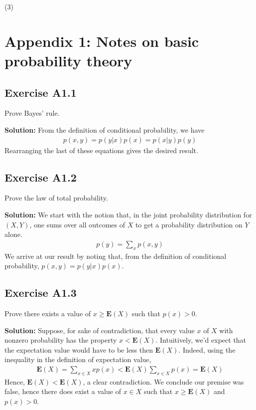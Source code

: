 \documentclass{book}
\begin{document}
    (3) 

\chapter*{Appendix 1: Notes on basic probability theory}


\section*{Exercise A1.1} 
    Prove Bayes' rule.
    
    \textbf{Solution:} From the definition of conditional probability, we have
    \begin{align}
        p(x,y) = p(y|x)p(x) = p(x|y)p(y)
    \end{align}
    Rearranging the last of these equations gives the desired result.

\section*{Exercise A1.2}
    Prove the law of total probability.
    
    \textbf{Solution:} We start with the notion that, in the joint probability distribution for $(X,Y)$, one sums over all outcomes of $X$ to get a probability distribution on $Y$ alone.
    \begin{align}
        p(y) = \sum_x p(x,y)
    \end{align}
    We arrive at our result by noting that, from the definition of conditional probability, $p(x,y) = p(y|x)p(x)$.

\section*{Exercise A1.3}
    Prove there exists a value of $x\geq\textbf{E}(X)$ such that $p(x)>0$.
    
    \textbf{Solution:} Suppose, for sake of contradiction, that every value $x$ of $X$ with nonzero probability has the property $x < \textbf{E}(X)$. Intuitively, we'd expect that the expectation value would have to be less then $\textbf{E}(X)$. Indeed, using the inequality in the definition of expectation value,
    \begin{align}
        \textbf{E}(X) = \sum_{x\in X} x p(x) < \textbf{E}(X)\sum_{x\in X}p(x) = \textbf{E}(X)
    \end{align}
    Hence, $\textbf{E}(X)<\textbf{E}(X)$, a clear contradiction. We conclude our premise was false, hence there does exist a value of $x\in X$ such that $x \geq \textbf{E}(X)$ and $p(x)>0$.
\end{document}
